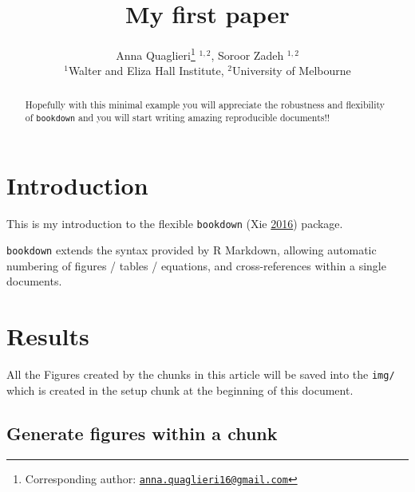\documentclass[12pt,]{article}
\title{My first paper}
\author{Anna Quaglieri\footnote{Corresponding author:
  \href{mailto:anna.quaglieri16@gmail.com}{\nolinkurl{anna.quaglieri16@gmail.com}}}
\(^{1,2}\), Soroor Zadeh \(^{1,2}\)\\
\(^1\)Walter and Eliza Hall Institute, \(^2\)University of Melbourne}
\date{}
\newenvironment{Shaded}{\begin{snugshade}}{\end{snugshade}}
\newcommand{\KeywordTok}[1]{\textcolor[rgb]{0.13,0.29,0.53}{\textbf{#1}}}
\newcommand{\DataTypeTok}[1]{\textcolor[rgb]{0.13,0.29,0.53}{#1}}
\newcommand{\DecValTok}[1]{\textcolor[rgb]{0.00,0.00,0.81}{#1}}
\newcommand{\StringTok}[1]{\textcolor[rgb]{0.31,0.60,0.02}{#1}}
\newcommand{\OtherTok}[1]{\textcolor[rgb]{0.56,0.35,0.01}{#1}}
\newcommand{\OperatorTok}[1]{\textcolor[rgb]{0.81,0.36,0.00}{\textbf{#1}}}
\newcommand{\NormalTok}[1]{#1}
\begin{document}
\maketitle
\begin{abstract}
Hopefully with this minimal example you will appreciate the robustness
and flexibility of \texttt{bookdown} and you will start writing amazing
reproducible documents!!
\end{abstract}

{
\setcounter{tocdepth}{2}
\tableofcontents
}
\newpage

\section{Introduction}\label{introduction}

\label{sec:intro}

This is my introduction to the flexible \texttt{bookdown} (Xie
\protect\hyperlink{ref-bookdown}{2016}) package.

\texttt{bookdown} extends the syntax provided by R Markdown, allowing
automatic numbering of figures / tables / equations, and
cross-references within a single documents.

\section{Results}\label{results}

\label{sec:res}

All the Figures created by the chunks in this article will be saved into
the \texttt{img/} which is created in the setup chunk at the beginning
of this document.

\begin{Shaded}
\end{Shaded}

\subsection{Generate figures within a
chunk}\label{generate-figures-within-a-chunk}
\end{document}
